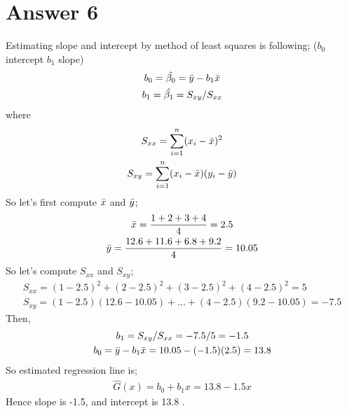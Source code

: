 \documentclass[12pt]{article}
\begin{document}
\section*{Answer 6}
Estimating slope and intercept by method of least squares is following; ($b_0$ intercept $b_1$ slope)
\begin{gather*}
b_0 = \Hat{\beta_0}    = \Bar{y} - b_1 \Bar{x} \\
b_1 = \Hat{\beta_1}    = S_{xy}/S_{xx}
\end{gather*}
where 
\begin{gather*}
    S_{xx} = \sum_{i=1}^n(x_i-\Bar{x})^2 \\
    S_{xy} = \sum_{i=1}^n(x_i-\Bar{x})(y_i-\Bar{y})
\end{gather*}
So let's first compute $\Bar{x}$ and $\Bar{y}$;
\begin{gather*}
    \Bar{x} = \dfrac{1+2+3+4}{4} = 2.5 \\
    \Bar{y} = \dfrac{12.6+11.6+6.8+9.2}{4} = 10.05 \\
\end{gather*}
So let's compute $S_{xx}$ and $S_{xy}$;
\begin{gather*}
    S_{xx} = (1-2.5)^2+(2-2.5)^2+(3-2.5)^2+(4-2.5)^2 = 5 \\
    S_{xy} = (1-2.5)(12.6-10.05)+...+(4-2.5)(9.2-10.05) = -7.5
\end{gather*}
Then,
\begin{gather*}
    b_1 = S_{xy}/S_{xx} = -7.5/5 = -1.5 \\
    b_0 = \Bar{y}-b_1\Bar{x} = 10.05 - (-1.5)(2.5) = 13.8
\end{gather*}
So estimated regression line is;
\begin{gather*}
    \hat{G}(x) = b_0 + b_1x = 13.8 -1.5x
\end{gather*}
Hence slope is -1.5, and intercept is 13.8 .
\end{document}
